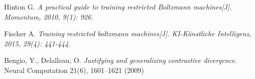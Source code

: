 \documentclass[a4paper,10pt]{article}
\newcommand{\todo}[1]{\textcolor{red}{TODO: #1}\PackageWarning{TODO:}{#1!}}
\begin{document}






\begin{thebibliography}{9}
	\setlength{\parskip}{0pt} 
	
	 Hinton G. \textit{ A practical guide to training restricted Boltzmann machines[J]. Momentum, 2010, 9(1): 926.}
	
	 Fischer A. \textit{Training restricted boltzmann machines[J]. KI-Künstliche Intelligenz, 2015, 29(4): 441-444.}

	  Bengio, Y., Delalleau, O. \textit{Justifying and generalizing contrastive divergence}. Neural Computation 21(6), 1601–1621 (2009)
	
\end{thebibliography}
\end{document}
